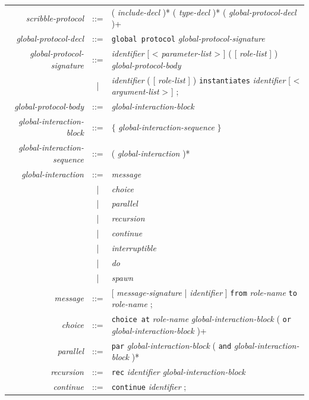 \documentclass[a4paper,11pt,twoside]{report}
\begin{document}
\begin{center}
\begin{tabular}{rcl}
\textit{scribble-protocol} &::=&( \textit{include-decl} )* ( \textit{type-decl} )*  ( \textit{global-protocol-decl} )+ \\
\textit{global-protocol-decl} &::=&\texttt{global protocol} \textit{global-protocol-signature}\\
\textit{global-protocol-signature} &::=& \textit{identifier} [ < \textit{parameter-list} > ] ( [ \textit{role-list} ] ) \textit{global-protocol-body}\\
 &|& \textit{identifier} ( [ \textit{role-list} ] ) \texttt{instantiates} \textit{identifier} [ < \textit{argument-list} > ] ;\\
\textit{global-protocol-body} &::= & \textit{global-interaction-block} \\
\textit{global-interaction-block} & ::= & $\{$ \textit{global-interaction-sequence} $\}$ \\
\textit{global-interaction-sequence} & ::= & ( \textit{global-interaction} )* \\
\textit{global-interaction} & ::= & \textit{message} \\
 &| & \textit{choice} \\
 & |& \textit{parallel} \\
 &| & \textit{recursion} \\
 &|& \textit{continue} \\
 &| & \textit{interruptible}\\ 
 & |& \textit{do} \\ 
 & |& \textit{spawn}\\
\textit{message} & ::= & [ \textit{message-signature} | \textit{identifier} ]  \texttt{from} \textit{role-name}  \texttt{to} \textit{role-name} ;\\
\textit{choice} & ::= & \texttt{choice at} \textit{role-name}  \textit{global-interaction-block}  ( \texttt{or}  \textit{global-interaction-block}  )+\\
\textit{parallel} & ::= & \texttt{par} \textit{global-interaction-block}  ( \texttt{and} \textit{global-interaction-block}  )*\\
 \textit{recursion} & ::= & \texttt{rec} \textit{identifier global-interaction-block}\\
\textit{continue} & ::= & \texttt{continue} \textit{identifier} ;\\
\end{tabular}
\end{center}
\end{document}
